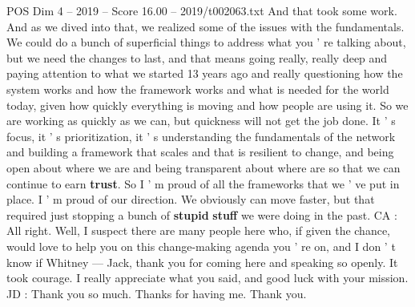 \begin{textsample}{POS Dim 4 – 2019 – Score 16.00 – 2019/t002063.txt}
And that took some work.
And as we dived into that, we realized some of the issues with the fundamentals.
We could do a bunch of superficial things to address what you ' re talking about, but we need the changes to last, and that means going really, really deep and paying attention to what we started 13 years ago and really questioning how the system works and how the framework works and what is needed for the world today, given how quickly everything is moving and how people are using it.
So we are working as quickly as we can, but quickness will not get the job done.
It ' s focus, it ' s prioritization, it ' s understanding the fundamentals of the network and building a framework that scales and that is resilient to change, and being open about where we are and being transparent about where are so that we can continue to earn \textbf{trust}.
So I ' m proud of all the frameworks that we ' ve put in place.
I ' m proud of our direction.
We obviously can move faster, but that required just stopping a bunch of \textbf{stupid} \textbf{stuff} we were doing in the past.
CA : All right.
Well, I suspect there are many people here who, if given the chance, would love to help you on this change-making agenda you ' re on, and I don ' t know if Whitney — Jack, thank you for coming here and speaking so openly.
It took courage.
I really appreciate what you said, and good luck with your mission.
JD : Thank you so much.
Thanks for having me.
Thank you.

\end{textsample}
